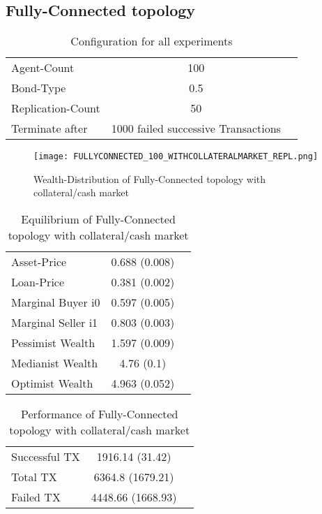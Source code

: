\documentclass[Bachelorarbeit.tex]{subfiles}
\begin{document}
\subsection{Fully-Connected topology}
\begin{table}[h]
	\centering
	\caption{Configuration for all experiments}
	\begin{tabular} { l c r }
		\hline
		Agent-Count & 100 \\
		Bond-Type & 0.5 \\
		Replication-Count & 50 \\
		Terminate after & 1000 failed successive Transactions \\
		\hline
	\end{tabular}
\end{table}

\begin{figure}[H]
	\centering
  \texttt{[image: FULLYCONNECTED\_100\_WITHCOLLATERALMARKET\_REPL.png]}
	\caption{Wealth-Distribution of Fully-Connected topology with collateral/cash market}
	\label{fig:wealth_FULLYCONNECTED_100_WITHCOLLATERALMARKET_REPL}
\end{figure}

\begin{table}[h]
	\caption{Equilibrium of Fully-Connected topology with collateral/cash market}
	\centering
	\begin{tabular} { l c r }
		\hline
		Asset-Price & 0.688 (0.008) \\
		Loan-Price & 0.381 (0.002) \\
		Marginal Buyer i0 & 0.597 (0.005) \\
		Marginal Seller i1 & 0.803 (0.003) \\
		\hline
		Pessimist Wealth & 1.597 (0.009) \\
		Medianist Wealth & 4.76 (0.1) \\
		Optimist Wealth & 4.963 (0.052) \\
		\hline
	\end{tabular}
\end{table} 

\begin{table}[h]
	\caption{Performance of Fully-Connected topology with collateral/cash market}
	\centering
	\begin{tabular} { l c r }
		\hline
		Successful TX & 1916.14 (31.42) \\
		Total TX & 6364.8 (1679.21) \\
		Failed TX & 4448.66 (1668.93) \\
		\hline
	\end{tabular}
\end{table}
\end{document}
